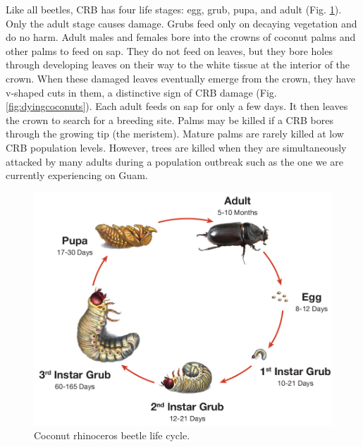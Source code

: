 \documentclass[twocolumn,letterpaper]{scrartcl}
\begin{document}
Like all beetles, CRB has four life stages: egg, grub, pupa, and adult (Fig. \ref{fig:crblifecycle}). Only the adult stage causes damage. Grubs feed only on decaying vegetation and do no harm. Adult males and females bore into the crowns of coconut palms and other palms to feed on sap. They do not feed on leaves, but they bore holes through developing leaves on their way to the white tissue at the interior of the crown. When these damaged leaves eventually emerge from the crown, they have v-shaped cuts in them, a distinctive sign of CRB damage (Fig. \ref{fig:dyingcoconuts}). Each adult feeds on sap for only a few days. It then leaves the crown to search for a breeding site. Palms may be killed if a CRB bores through the growing tip (the meristem). Mature palms are rarely killed at low CRB population levels. However, trees are killed when they are simultaneously attacked by many adults during a population outbreak such as the one we are currently experiencing on Guam.

\begin{figure}[hb]
	\centering
	\includegraphics[width=\linewidth]{images/crb_life_cycle}
	\caption{Coconut rhinoceros beetle life cycle.}
	\label{fig:crblifecycle}
\end{figure}
\end{document}
